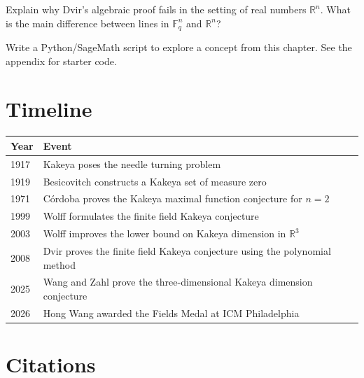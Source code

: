 \begin{exercise}[Challenge]
Explain why Dvir's algebraic proof fails in the setting of real numbers $\mathbb{R}^n$. What is the main difference between lines in $\mathbb{F}_q^n$ and $\mathbb{R}^n$?
\end{exercise}

\begin{exercise}[Computational]
Write a Python/SageMath script to explore a concept from this chapter. See the appendix for starter code.
\end{exercise}

\section{Timeline}

\begin{tabularx}{\linewidth}{lX}
\toprule
\textbf{Year} & \textbf{Event} \\ \midrule
1917 & Kakeya poses the needle turning problem \cite{kakeya1917} \\
1919 & Besicovitch constructs a Kakeya set of measure zero \cite{besicovitch1919} \\
1971 & C\'ordoba proves the Kakeya maximal function conjecture for $n=2$ \\
1999 & Wolff formulates the finite field Kakeya conjecture \cite{wolff1999} \\
2003 & Wolff improves the lower bound on Kakeya dimension in $\mathbb{R}^3$ \\
2008 & Dvir proves the finite field Kakeya conjecture using the polynomial method \cite{dvir2009} \\
2025 & Wang and Zahl prove the three-dimensional Kakeya dimension conjecture \cite{wangzahl2025} \\
2026 & Hong Wang awarded the Fields Medal at ICM Philadelphia \\
\bottomrule
\end{tabularx}

\section{Citations}

